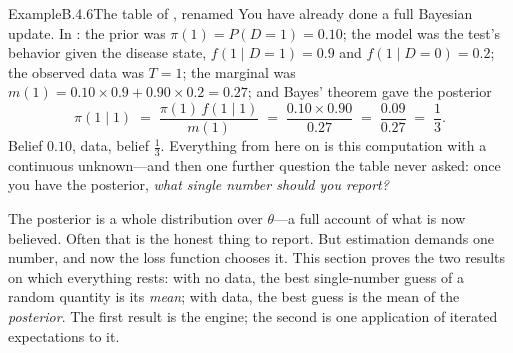 \documentclass[main.tex]{subfiles}
\begin{document}
\begin{ObjL}{Example}{B.4.6}{The table of , renamed}
You have already done a full Bayesian update. In : the prior was
$\pi(1)=P(D=1)=0.10$; the model was the test's behavior given the disease state,
$f(1\mid D=1)=0.9$ and $f(1\mid D=0)=0.2$; the observed data was $T=1$; the marginal was
$m(1)=0.10\times0.9+0.90\times0.2=0.27$; and Bayes' theorem gave the posterior
\[ \pi(1\mid 1) \;=\; \frac{\pi(1)\,f(1\mid1)}{m(1)}
   \;=\; \frac{0.10\times0.90}{0.27} \;=\; \frac{0.09}{0.27} \;=\; \frac13 . \]
Belief $0.10$, data, belief $\tfrac13$. Everything from here on is this computation with a
continuous unknown---and then one further question the table never asked: once you have the
posterior, \emph{what single number should you report?}
\end{ObjL}


The posterior is a whole distribution over $\theta$---a full account of what is now
believed. Often that is the honest thing to report. But estimation demands one number, and
now the loss function chooses it. This section proves the two results on which everything
rests: with no data, the best single-number guess of a random quantity is its \emph{mean};
with data, the best guess is the mean of the \emph{posterior}. The first result is the
engine; the second is one application of iterated expectations to it.
\end{document}
